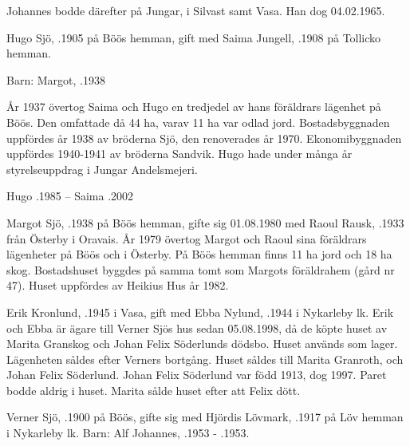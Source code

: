 Johannes bodde därefter på Jungar, i Silvast samt Vasa. Han dog 04.02.1965.




Hugo Sjö, .1905 på Böös hemman, gift med Saima Jungell, .1908 på Tollicko hemman.

Barn: Margot, .1938


År 1937 övertog Saima och Hugo en tredjedel av hans föräldrars lägenhet på Böös. Den omfattade då 44 ha, varav 11 ha var odlad jord. Bostadsbyggnaden uppfördes år 1938 av bröderna Sjö, den renoverades år 1970. Ekonomibyggnaden uppfördes 1940-1941 av bröderna Sandvik. Hugo hade under många år styrelseuppdrag i Jungar Andelsmejeri.

Hugo .1985  --  Saima .2002



Margot Sjö, .1938 på Böös hemman, gifte sig 01.08.1980 med Raoul Rausk, .1933 från Österby i Oravais. År 1979 övertog Margot och Raoul sina föräldrars lägenheter på Böös och i Österby. På Böös hemman finns 11 ha jord och 18 ha skog. Bostadshuset byggdes på samma tomt som Margots föräldrahem (gård nr 47). Huset uppfördes av Heikius Hus år 1982.




Erik Kronlund, .1945 i Vasa, gift med Ebba Nylund, .1944 i Nykarleby lk. Erik och Ebba är ägare till Verner Sjös hus sedan 05.08.1998, då de köpte huset av Marita Granskog och Johan Felix Söderlunds dödsbo. Huset används som lager.
Lägenheten såldes efter Verners bortgång. Huset såldes till Marita Granroth,  och Johan Felix Söderlund. Johan Felix Söderlund var född 1913, dog 1997. Paret bodde aldrig i huset. Marita sålde huset efter att Felix dött.

Verner Sjö,  .1900 på Böös, gifte sig med Hjördis Lövmark, .1917 på Löv hemman i Nykarleby lk. Barn: Alf Johannes, .1953 - .1953.

